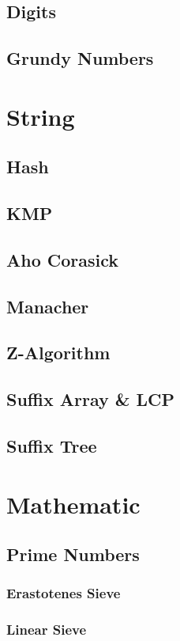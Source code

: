 \documentclass[10pt,a4paper]{report}
\begin{document}
	\section{Digits}
	\section{Grundy Numbers}
	
\chapter{String}
	\section{Hash}
	\section{KMP}
	\section{Aho Corasick}
	\section{Manacher}
	\section{Z-Algorithm}
	\section{Suffix Array \& LCP}
	\section{Suffix Tree}
	
\chapter{Mathematic}
	\section{Prime Numbers}
		\subsection{Erastotenes Sieve}
		\subsection{Linear Sieve}
\end{document}
